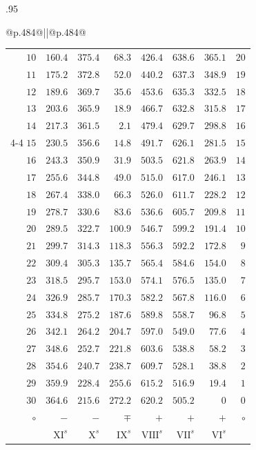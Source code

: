 \begin{GaussVICeresFrame}{.95}
\begin{tabular}{@{}p{.484\linewidth}@{\hspace{2pt}}||@{\hspace{2pt}}p{.484\linewidth}@{}}
{\begin{tabular}{r@{\GaussVICeresRule}r|r|r|r|r|r@{\GaussVICeresRule}r}
$10$ & $160.4$ & $375.4$ & $68.3$ & $426.4$ & $638.6$ & $365.1$ & $20$ \\[3pt]
$11$ & $175.2$ & $372.8$ & $52.0$ & $440.2$ & $637.3$ & $348.9$ & $19$ \\
$12$ & $189.6$ & $369.7$ & $35.6$ & $453.6$ & $635.3$ & $332.5$ & $18$ \\
$13$ & $203.6$ & $365.9$ & $18.9$ & $466.7$ & $632.8$ & $315.8$ & $17$ \\
$14$ & $217.3$ & $361.5$ & $2.1$ & $479.4$ & $629.7$ & $298.8$ & $16$ \\
\cline{4-4}
$15$ & $230.5$ & $356.6$ & $14.8$ & $491.7$ & $626.1$ & $281.5$ & $15$ \\[3pt]
$16$ & $243.3$ & $350.9$ & $31.9$ & $503.5$ & $621.8$ & $263.9$ & $14$ \\
$17$ & $255.6$ & $344.8$ & $49.0$ & $515.0$ & $617.0$ & $246.1$ & $13$ \\
$18$ & $267.4$ & $338.0$ & $66.3$ & $526.0$ & $611.7$ & $228.2$ & $12$ \\
$19$ & $278.7$ & $330.6$ & $83.6$ & $536.6$ & $605.7$ & $209.8$ & $11$ \\
$20$ & $289.5$ & $322.7$ & $100.9$ & $546.7$ & $599.2$ & $191.4$ & $10$ \\[3pt]
$21$ & $299.7$ & $314.3$ & $118.3$ & $556.3$ & $592.2$ & $172.8$ & $9$ \\
$22$ & $309.4$ & $305.3$ & $135.7$ & $565.4$ & $584.6$ & $154.0$ & $8$ \\
$23$ & $318.5$ & $295.7$ & $153.0$ & $574.1$ & $576.5$ & $135.0$ & $7$ \\
$24$ & $326.9$ & $285.7$ & $170.3$ & $582.2$ & $567.8$ & $116.0$ & $6$ \\
$25$ & $334.8$ & $275.2$ & $187.6$ & $589.8$ & $558.7$ & $96.8$ & $5$ \\[3pt]
$26$ & $342.1$ & $264.2$ & $204.7$ & $597.0$ & $549.0$ & $77.6$ & $4$ \\
$27$ & $348.6$ & $252.7$ & $221.8$ & $603.6$ & $538.8$ & $58.2$ & $3$ \\
$28$ & $354.6$ & $240.7$ & $238.7$ & $609.7$ & $528.1$ & $38.8$ & $2$ \\
$29$ & $359.9$ & $228.4$ & $255.6$ & $615.2$ & $516.9$ & $19.4$ & $1$ \\
$30$ & $364.6$ & $215.6$ & $272.2$ & $620.2$ & $505.2$ & $0$ & $0$ \\
\hline $\circ$ & $-$ & $-$ & $\mp$ & $+$ & $+$ & $+$ & $\circ$ \\
 & $\mathrm{XI}^s$ & $\mathrm{X}^s$ & $\mathrm{IX}^s$ & $\mathrm{VIII}^s$ & $\mathrm{VII}^s$ & $\mathrm{VI}^s$ & \\

\end{tabular}}
\end{tabular}
\end{GaussVICeresFrame}
